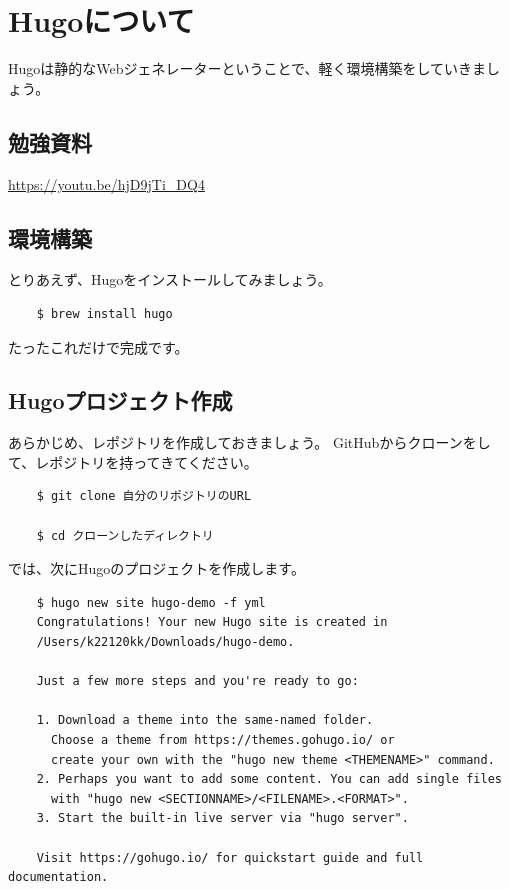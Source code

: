 \chapter{Hugoについて}
Hugoは静的なWebジェネレーターということで、軽く環境構築をしていきましょう。

\section{勉強資料}
  \url{https://youtu.be/hjD9jTi_DQ4}

\section{環境構築}
とりあえず、Hugoをインストールしてみましょう。

  \begin{shaded}
    \begin{verbatim}
    $ brew install hugo
    \end{verbatim}
  \end{shaded}
  たったこれだけで完成です。

\section{Hugoプロジェクト作成}
  あらかじめ、レポジトリを作成しておきましょう。
  GitHubからクローンをして、レポジトリを持ってきてください。

  \begin{shaded}
    \begin{verbatim}
    $ git clone 自分のリポジトリのURL

    $ cd クローンしたディレクトリ
    \end{verbatim}
  \end{shaded}

    では、次にHugoのプロジェクトを作成します。

  \begin{shaded}
    \begin{verbatim}
    $ hugo new site hugo-demo -f yml
    Congratulations! Your new Hugo site is created in 
    /Users/k22120kk/Downloads/hugo-demo.

    Just a few more steps and you're ready to go:

    1. Download a theme into the same-named folder.
      Choose a theme from https://themes.gohugo.io/ or
      create your own with the "hugo new theme <THEMENAME>" command.
    2. Perhaps you want to add some content. You can add single files
      with "hugo new <SECTIONNAME>/<FILENAME>.<FORMAT>".
    3. Start the built-in live server via "hugo server".

    Visit https://gohugo.io/ for quickstart guide and full documentation.
    \end{verbatim}
  \end{shaded}

